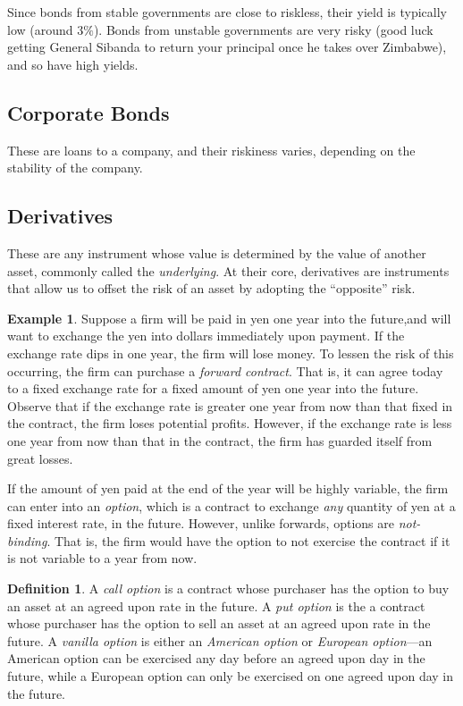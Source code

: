 \documentclass[12pt]{amsbook}
\theoremstyle{plain}
\theoremstyle{definition}
\newtheorem*{definition}{Definition}
\newtheorem*{example}{Example}
\theoremstyle{remark}
\numberwithin{equation}{section}  %
\begin{document}
	Since bonds from stable governments are close to riskless, their yield is 
	typically low (around $3\%$). Bonds from unstable governments are very risky 
	(good luck getting General Sibanda to return your principal once he takes over 
	Zimbabwe), and so have high yields.
	\subsection*{Corporate Bonds}
	These are loans to a company, and their riskiness varies, depending on the 
	stability of the company. 
	\subsection*{Derivatives}
	These are any instrument whose value is determined by the value of another 
	asset, commonly called the \emph{underlying}. At their core, derivatives are 
	instruments that allow us to offset the risk of an asset by adopting the 
	``opposite'' risk.
	\begin{example}
		Suppose a firm will be paid in yen one year into the future,and will want 
		to exchange the yen into dollars immediately upon payment.
		If the exchange rate dips in one year, the firm will lose money. To lessen 
		the risk of this occurring, the firm can purchase a \emph{forward 
		contract}. That is, it can agree today to a fixed exchange rate for a fixed 
		amount of yen one year into the future. Observe that if the exchange rate 
		is greater one year from now than that fixed in the contract, the firm 
		loses potential profits. However, if the exchange rate is less one year 
		from now than that in the contract, the firm has guarded itself from great 
		losses. 
	\end{example}
	If the amount of yen paid at the end of the year will be highly variable, the 
	firm can enter into an \emph{option}, which is a contract to exchange 
	\emph{any} quantity of yen at a fixed interest rate, in the future. However, 
	unlike forwards, options are \emph{not-binding}. That is, the firm would have 
	the option to not exercise the contract if it is not variable to a year from 
	now.
	\begin{definition}
		A \emph{call option} is a contract whose purchaser has the option to buy an 
		asset at an agreed upon rate in the future. A \emph{put option} is the a 
		contract whose purchaser has the option to sell an asset at an agreed upon 
		rate in the future. A \emph{vanilla option} is either an \emph{American 
		option} or \emph{European option}---an American option can be exercised any 
		day before an agreed upon day in the future, while a European option can 
		only be exercised on one agreed upon day in the future.
	\end{definition}
\end{document}
